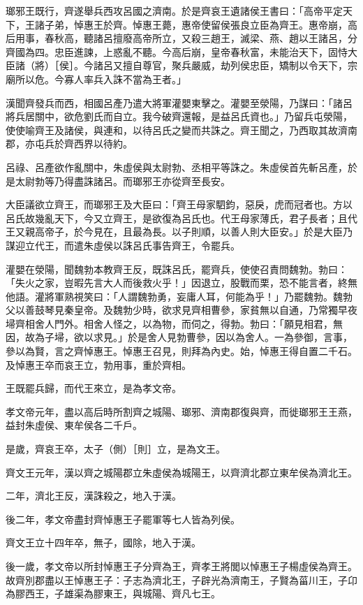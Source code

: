 \begin{pinyinscope}
瑯邪王既行，齊遂舉兵西攻呂國之濟南。於是齊哀王遺諸侯王書曰：「高帝平定天下，王諸子弟，悼惠王於齊。悼惠王薨，惠帝使留侯張良立臣為齊王。惠帝崩，高后用事，春秋高，聽諸呂擅廢高帝所立，又殺三趙王，滅梁、燕、趙以王諸呂，分齊國為四。忠臣進諫，上惑亂不聽。今高后崩，皇帝春秋富，未能治天下，固恃大臣諸（將）［侯］。今諸呂又擅自尊官，聚兵嚴威，劫列侯忠臣，矯制以令天下，宗廟所以危。今寡人率兵入誅不當為王者。」

漢聞齊發兵而西，相國呂產乃遣大將軍灌嬰東擊之。灌嬰至滎陽，乃謀曰：「諸呂將兵居關中，欲危劉氏而自立。我今破齊還報，是益呂氏資也。」乃留兵屯滎陽，使使喻齊王及諸侯，與連和，以待呂氏之變而共誅之。齊王聞之，乃西取其故濟南郡，亦屯兵於齊西界以待約。

呂祿、呂產欲作亂關中，朱虛侯與太尉勃、丞相平等誅之。朱虛侯首先斬呂產，於是太尉勃等乃得盡誅諸呂。而瑯邪王亦從齊至長安。

大臣議欲立齊王，而瑯邪王及大臣曰：「齊王母家駟鈞，惡戾，虎而冠者也。方以呂氏故幾亂天下，今又立齊王，是欲復為呂氏也。代王母家薄氏，君子長者；且代王又親高帝子，於今見在，且最為長。以子則順，以善人則大臣安。」於是大臣乃謀迎立代王，而遣朱虛侯以誅呂氏事告齊王，令罷兵。

灌嬰在滎陽，聞魏勃本教齊王反，既誅呂氏，罷齊兵，使使召責問魏勃。勃曰：「失火之家，豈暇先言大人而後救火乎！」因退立，股戰而栗，恐不能言者，終無他語。灌將軍熟視笑曰：「人謂魏勃勇，妄庸人耳，何能為乎！」乃罷魏勃。魏勃父以善鼓琴見秦皇帝。及魏勃少時，欲求見齊相曹參，家貧無以自通，乃常獨早夜埽齊相舍人門外。相舍人怪之，以為物，而伺之，得勃。勃曰：「願見相君，無因，故為子埽，欲以求見。」於是舍人見勃曹參，因以為舍人。一為參御，言事，參以為賢，言之齊悼惠王。悼惠王召見，則拜為內史。始，悼惠王得自置二千石。及悼惠王卒而哀王立，勃用事，重於齊相。

王既罷兵歸，而代王來立，是為孝文帝。

孝文帝元年，盡以高后時所割齊之城陽、瑯邪、濟南郡復與齊，而徙瑯邪王王燕，益封朱虛侯、東牟侯各二千戶。

是歲，齊哀王卒，太子（側）［則］立，是為文王。

齊文王元年，漢以齊之城陽郡立朱虛侯為城陽王，以齊濟北郡立東牟侯為濟北王。

二年，濟北王反，漢誅殺之，地入于漢。

後二年，孝文帝盡封齊悼惠王子罷軍等七人皆為列侯。

齊文王立十四年卒，無子，國除，地入于漢。

後一歲，孝文帝以所封悼惠王子分齊為王，齊孝王將閭以悼惠王子楊虛侯為齊王。故齊別郡盡以王悼惠王子：子志為濟北王，子辟光為濟南王，子賢為菑川王，子卬為膠西王，子雄渠為膠東王，與城陽、齊凡七王。


\end{pinyinscope}
